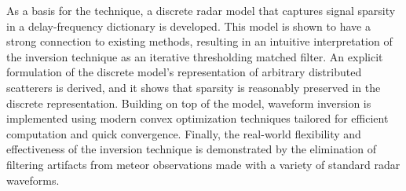As a basis for the technique, a discrete radar model that captures signal sparsity in a delay-frequency dictionary is developed. This model is shown to have a strong connection to existing methods, resulting in an intuitive interpretation of the inversion technique as an iterative thresholding matched filter. An explicit formulation of the discrete model's representation of arbitrary distributed scatterers is derived, and it shows that sparsity is reasonably preserved in the discrete representation. Building on top of the model, waveform inversion is implemented using modern convex optimization techniques tailored for efficient computation and quick convergence. Finally, the real-world flexibility and effectiveness of the inversion technique is demonstrated by the elimination of filtering artifacts from meteor observations made with a variety of standard radar waveforms.

\newpage
